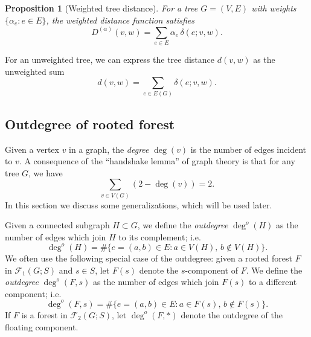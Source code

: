 \documentclass{amsart}
\newtheorem{prop}[thm]{Proposition}
\theoremstyle{definition}
\newcommand{\Da}{{D^{(\alpha)}}}
\newcommand{\forests}{\mathcal{F}}
\newcommand{\degout}{\deg^o}
\begin{document}
\begin{prop}[Weighted tree distance]
\label{prop:distance-sum}
For a tree $G = (V,E)$ with weights $\{\alpha_e : e \in E\}$,
the weighted distance function satisfies
\[ \Da(v,w) = \sum_{e \in E} \alpha_e \, \delta(e; v,w) .\]
\end{prop}

For an unweighted tree, we can express the tree distance $d(v,w)$ as the unweighted sum
\begin{equation*}
	d(v,w) = \sum_{e \in E(G)} \delta(e; v,w).
\end{equation*}


\subsection{Outdegree of rooted forest}

Given a vertex $v$ in a graph, the {\em degree} $\deg(v)$ is the number of edges incident to $v$.
A consequence of the ``handshake lemma'' of graph theory is that for any tree $G$, we have
\[
\sum_{v \in V(G)} (2 - \deg(v)) = 2.
\]
In this section we discuss some generalizations, which will be used later.

Given a connected subgraph $H \subset G$,
we define the {\em outdegree} $\degout(H)$ as the number of edges which join $H$ to its complement; i.e.
\begin{equation}
\label{eq:outdeg}
	\degout(H) = \#\{ e = (a,b) \in E : a \in V(H),\, b \not\in V(H)\}.
\end{equation}
We often use the following special case of the outdegree: given a rooted forest $F$ in $\forests_1(G;S)$ and $s \in S$,
let $F(s)$ denote the $s$-component of $F$.
We define the {\em outdegree} $\degout(F,s)$ as the number of edges which join $F(s)$ to a different component; i.e.
\begin{equation}
\label{eq:outdeg-forest}
	\degout(F,s) = \#\{ e = (a,b) \in E : a \in F(s),\, b \not\in F(s)\}.
\end{equation}
If $F$ is a forest in $\forests_2(G;S)$, let $\degout(F,*)$ denote the outdegree of the floating component.
\end{document}
